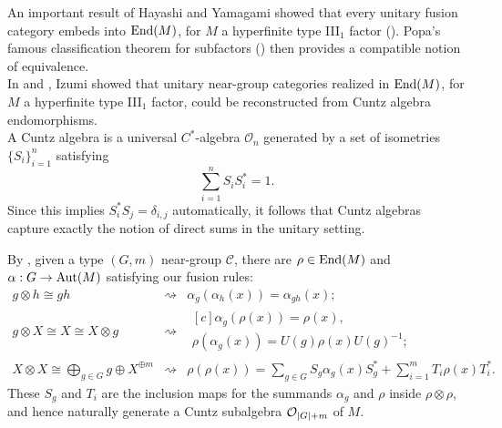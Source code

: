 \documentclass{beamer}
\DeclarePairedDelimiter{\abs}{\lvert}{\rvert}
\begin{document}


\begin{frame}
An important result of Hayashi and Yamagami showed that \textcolor{structure}{every unitary fusion category} embeds into $\textup{End}(M)$, for $M$ a hyperfinite type III$_1$ factor (\cite{HY00}). Popa's famous classification theorem for subfactors (\cite{Pop95}) then provides a compatible notion of equivalence.\\[2ex]

In \cite{Izu93} and \cite{Izu01}, Izumi showed that unitary near-group categories realized in $\textup{End}(M)$, for $M$ a hyperfinite type III$_1$ factor, could be reconstructed from \textcolor{structure}{Cuntz algebra endomorphisms}.\\[2ex]

A \textcolor{structure}{Cuntz algebra} is a universal $C^*$-algebra $\mathcal{O}_n$ generated by a set of isometries $\{S_i\}_{i=1}^n$ satisfying
\[
\sum_{i=1}^n S_iS_i^* = 1.
\]
Since this implies $S_i^*S_j = \delta_{i,j}$ automatically, it follows that Cuntz algebras capture exactly the notion of \textcolor{structure}{direct sums} in the unitary setting.\\[2ex]
\end{frame}

\begin{frame}
By \cite{HY00}, given a \textcolor{structure}{type $(G, m)$ near-group} $\mathcal{C}$, there are $\rho \in \textup{End}(M)$ and $\alpha : G \to \textup{Aut}(M)$ satisfying our fusion rules:
\[\begin{array}{ccc}
g \otimes h \cong gh&\rightsquigarrow&\alpha_g(\alpha_h(x)) = \alpha_{gh}(x);\\[2ex]
g \otimes X \cong X \cong X \otimes g&\rightsquigarrow&\begin{matrix*}[c]\alpha_g(\rho(x)) = \rho(x),\\[1ex]\rho(\alpha_g(x)) = U(g)\rho(x)U(g)^{-1};\end{matrix*}\\[4ex]
\displaystyle X \otimes X \cong \bigoplus_{g \in G}g \oplus X^{\oplus m}&\rightsquigarrow&\rho(\rho(x)) = \displaystyle\sum_{g \in G}{S_g\alpha_g(x)S_g^*} + \sum_{i=1}^m{T_i\rho(x)T_i^*}.
\end{array}\]
These $S_g$ and $T_i$ are the inclusion maps for the summands $\alpha_g$ and $\rho$ inside $\rho \otimes \rho$, and hence naturally generate a Cuntz subalgebra $\mathcal{O}_{\abs{G}+m}$ of $M$.
\end{frame}
\end{document}
